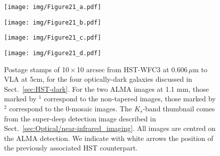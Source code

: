 \documentclass[longauth]{aa}
\begin{document}
\begin{figure}
\centering
\begin{minipage}[t]{0.5\textwidth}
\resizebox{\hsize}{!} {
\texttt{[image: img/Figure21\_a.pdf]}}
\end{minipage}
\begin{minipage}[t]{0.5\textwidth}
\resizebox{\hsize}{!} {
\texttt{[image: img/Figure21\_b.pdf]}}
\end{minipage}
\begin{minipage}[t]{0.5\textwidth}
\resizebox{\hsize}{!} {
\texttt{[image: img/Figure21\_c.pdf]}}
\end{minipage}
\begin{minipage}[t]{0.5\textwidth}
\resizebox{\hsize}{!} {
\texttt{[image: img/Figure21\_d.pdf]}}
\end{minipage}
\caption{Postage stamps of 10\,$\times$\,10 arcsec from HST-WFC3 at 0.606\,$\mu$m to VLA at 5cm, for the four optically-dark galaxies discussed in Sect.~\ref{sec:HST-dark}. For the two ALMA images at 1.1 mm, those marked by $^1$ correspond to the non-tapered images, those marked by $^2$ correspond to the 0-mosaic images. The $K_s$-band thumbnail comes from the super-deep detection image described in Sect.~\ref{sec:Optical/near-infrared_imaging}. All images are centred on the ALMA detection. We indicate with white arrows the position of the previously associated HST counterpart.}
\label{multiwavelength-dark-HST}
\end{figure}
\end{document}
